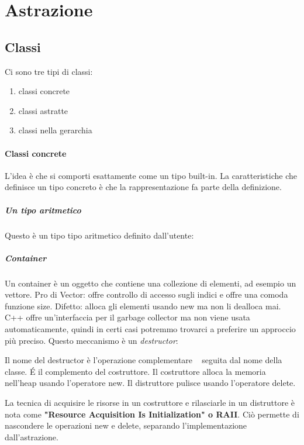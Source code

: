 \documentclass[11pt,a4paper]{book}
\begin{document}
\chapter{Astrazione}
\section{Classi}
Ci sono tre tipi di classi:
\begin{enumerate}
	\item classi concrete
	\item classi astratte
	\item classi nella gerarchia
\end{enumerate}
\subsubsection{Classi concrete}
L'idea è che si comporti esattamente come un tipo built-in. La caratteristiche che definisce un tipo concreto è che la rappresentazione fa parte della definizione.

\paragraph{Un tipo aritmetico}
Questo è un tipo tipo aritmetico definito dall'utente:
\label{code: 024}

\paragraph{Container}
Un container è un oggetto che contiene una collezione di elementi, ad esempio un vettore. Pro di Vector: offre controllo di accesso sugli indici e offre una comoda funzione size. Difetto: alloca gli elementi usando new ma non li dealloca mai. C++ offre un'interfaccia per il garbage collector ma non viene usata automaticamente, quindi in certi casi potremmo trovarci a preferire un approccio più preciso. Questo meccanismo è un \emph{destructor}:
\label{code: 025}

Il nome del destructor è l'operazione complementare ~ seguita dal nome della classe. É il complemento del costruttore. Il costruttore alloca la memoria nell'heap usando l'operatore new. Il distruttore pulisce usando l'operatore delete.

La tecnica di acquisire le risorse in un costruttore e rilasciarle in un distruttore è nota come \textbf{"Resource Acquisition Is Initialization" o RAII}. Ciò permette di nascondere le operazioni new e delete, separando l'implementazione dall'astrazione.
\end{document}
